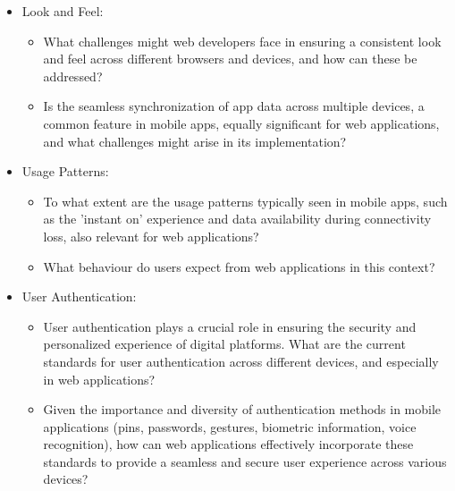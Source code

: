 \begin{itemize}
  \item Look and Feel:
    \begin{itemize}
      \item What challenges might web developers face in ensuring a consistent look and feel across different browsers and devices, and how can these be addressed?
      \item Is the seamless synchronization of app data across multiple devices, a common feature in mobile apps, equally significant for web applications, and what challenges might arise in its implementation?
    \end{itemize}
  \item Usage Patterns:
    \begin{itemize}
      \item To what extent are the usage patterns typically seen in mobile apps, such as the 'instant on' experience and data availability during connectivity loss, also relevant for web applications?
      \item What behaviour do users expect from web applications in this context?
    \end{itemize}
  \item User Authentication:
    \begin{itemize}
      \item User authentication plays a crucial role in ensuring the security and personalized experience of digital platforms. What are the current standards for user authentication across different devices, and especially in web applications?
      \item Given the importance and diversity of authentication methods in mobile applications (pins, passwords, gestures, biometric information, voice recognition), how can web applications effectively incorporate these standards to provide a seamless and secure user experience across various devices?
    \end{itemize}
\end{itemize}
